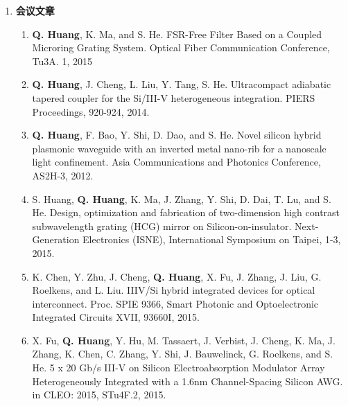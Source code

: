 \begin{publications}
\begin{enumerate}[]
\begin{enumerate}[1.]
	\end{enumerate}
	\item \textbf{会议文章}
	\begin{enumerate}[1.]
		\item \textbf{Q. Huang}, K. Ma, and S. He. FSR-Free Filter Based on a Coupled Microring Grating System. Optical Fiber Communication Conference, Tu3A. 1, 2015 
		\item \textbf{Q. Huang}, J. Cheng, L. Liu, Y. Tang, S. He. Ultracompact adiabatic tapered coupler for the Si/III-V heterogeneous integration. PIERS Proceedings, 920-924, 2014.
		\item \textbf{Q. Huang}, F. Bao, Y. Shi, D. Dao, and S. He. Novel silicon hybrid plasmonic waveguide with an inverted metal nano-rib for a nanoscale light confinement. Asia Communications and Photonics Conference, AS2H-3, 2012.
		\item S. Huang, \textbf{Q. Huang}, K. Ma, J. Zhang, Y. Shi, D. Dai, T. Lu, and S. He. Design, optimization and fabrication of two-dimension high contrast subwavelength grating (HCG) mirror on Silicon-on-insulator. Next-Generation Electronics (ISNE), International Symposium on Taipei, 1-3, 2015.
		\item K. Chen, Y. Zhu, J. Cheng, \textbf{Q. Huang}, X. Fu, J. Zhang, J. Liu, G. Roelkens, and L. Liu. IIIV/Si hybrid integrated devices for optical interconnect. Proc. SPIE 9366, Smart Photonic and Optoelectronic Integrated Circuits XVII, 93660I, 2015.
		\item X. Fu, \textbf{Q. Huang}, Y. Hu, M. Tassaert, J. Verbist, J. Cheng, K. Ma, J. Zhang, K. Chen, C. Zhang, Y. Shi, J. Bauwelinck, G. Roelkens, and S. He. 5 x 20 Gb/s III-V on Silicon Electroabsorption Modulator Array Heterogeneously Integrated with a 1.6nm Channel-Spacing Silicon AWG. in CLEO: 2015, STu4F.2, 2015.
	\end{enumerate}
\end{enumerate}
\end{publications}
